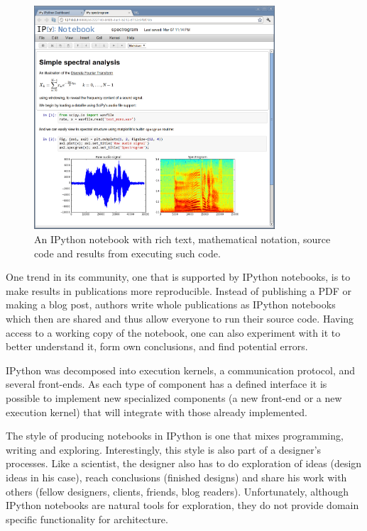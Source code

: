 \documentclass{./llncs2e/llncs}
\begin{document}
	\begin{figure}
		\centering
		\includegraphics[width=0.8\textwidth]{img/ipython_notebook}
		\caption{An IPython notebook with rich text, mathematical notation, source code and results from executing such code.}
		\label{fig:ipython:notebook}
	\end{figure}
	
	One trend in its community, one that is supported by IPython notebooks, is to make results in publications more reproducible. 
	Instead of publishing a PDF or making a blog post, authors write whole publications as IPython notebooks which then are shared and thus allow everyone to run their source code. 
	Having access to a working copy of the notebook, one can also experiment with it to better understand it, form own conclusions, and find potential errors.
	
	IPython was decomposed into execution kernels, a communication protocol, and several front-ends. 
	As each type of component has a defined interface it is possible to implement new specialized components (a new front-end or a new execution kernel) that will integrate with those already implemented.
	
	The style of producing notebooks in IPython is one that mixes programming, writing and exploring. 
	Interestingly, this style is also part of a designer's processes. 
	Like a scientist, the designer also has to do exploration of ideas (design ideas in his case), reach conclusions (finished designs) and share his work with others (fellow designers, clients, friends, blog readers). 
	Unfortunately, although IPython notebooks are natural tools for exploration, they do not provide domain specific functionality for architecture.
	
\end{document}
